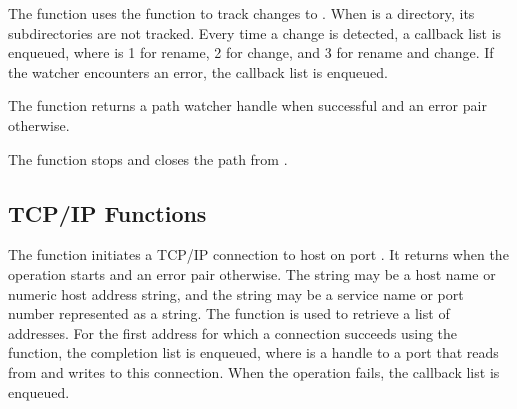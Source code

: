\begin{function}
\end{function}

The  function uses the
 function to track changes to
. When  is a directory, its subdirectories are not
tracked. Every time a change is detected, a callback list
 is enqueued, where
 is 1 for rename, 2 for change, and 3 for rename and
change.  If the watcher encounters an error, the callback list
 is enqueued.

The  function returns a path watcher handle
when successful and an error pair otherwise.

\begin{function}
\end{function}

The  function stops and closes the
path  from .

\subsection {TCP/IP Functions}

\begin{function}
\end{function}

The  function initiates a TCP/IP connection to
host  on port . It returns  when the
operation starts and an error pair otherwise. The  string
may be a host name or numeric host address string, and the
 string may be a service name or port number represented
as a string. The  function is used to retrieve a
list of addresses. For the first address for which a connection
succeeds using the  function, the completion
list  is enqueued, where 
is a handle to a port that reads from and writes to this
connection. When the operation fails, the callback list
 is enqueued.

